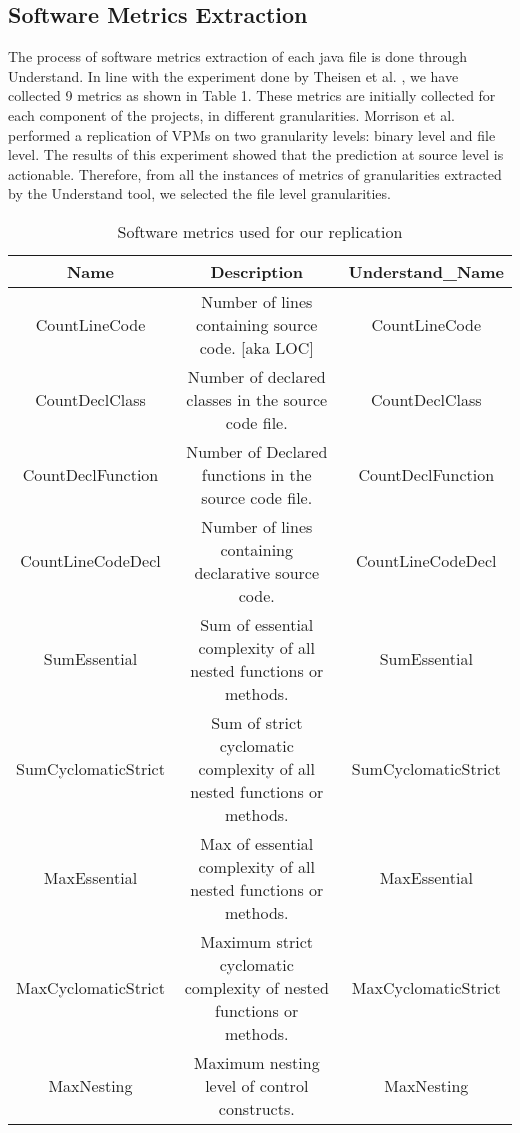 \documentclass[twocolumn,10pt]{asme2ej}
\begin{document}
\subsection{Software Metrics Extraction}\label{m:sm}
The process of software metrics extraction of each java file is done through Understand.
In line with the experiment done by Theisen et al. \cite{Theisen}, we have collected 9 metrics as shown in Table 1.
These metrics are initially collected for each component of the projects, in different granularities.
Morrison et al. \cite{Morrison} performed a replication of VPMs on two granularity levels: binary level and file level. 
The results of this experiment showed that the prediction at source level is actionable.
Therefore, from all the instances of metrics of granularities extracted by the Understand tool, we selected the file level granularities.
\begin{table*}[t]
\centering
\caption{Software metrics used for our replication}
\label{table:software_metrics}
\begin{tabular}{|c|c|c|}
\hline
Name & Description & Understand\_Name \\
\hline \hline
CountLineCode & Number of lines containing source code. [aka LOC] & CountLineCode \\
\hline
CountDeclClass & Number of declared classes in the source code file. & CountDeclClass \\
\hline
CountDeclFunction & Number of Declared functions in the source code file. & CountDeclFunction \\
\hline
CountLineCodeDecl  &Number of lines containing declarative source code. & CountLineCodeDecl \\
\hline
SumEssential & Sum of essential complexity of all nested functions or methods. & SumEssential \\
\hline
SumCyclomaticStrict & Sum of strict cyclomatic complexity of all nested functions or methods. & SumCyclomaticStrict \\
\hline
MaxEssential & Max of essential complexity of all nested functions or methods. & MaxEssential \\
\hline
MaxCyclomaticStrict & Maximum strict cyclomatic complexity of nested functions or methods. & MaxCyclomaticStrict\\
\hline
MaxNesting & Maximum nesting level of control constructs. & MaxNesting \\
\hline
\end{tabular}

\end{table*}
\end{document}
